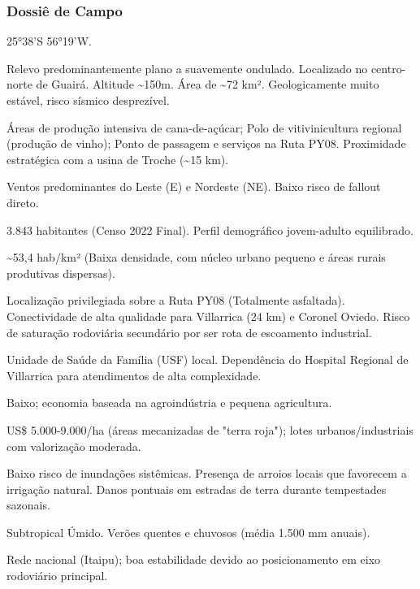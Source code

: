 \subsubsection{Dossiê de Campo}
\begin{description}[style=nextline,leftmargin=0.5cm,font=\bfseries]
\item[Coordenadas]  25°38'S 56°19'W.
\item[Topografia]  Relevo predominantemente plano a suavemente ondulado. Localizado no centro-norte de Guairá. Altitude \textasciitilde 150m. Área de \textasciitilde 72 km². Geologicamente muito estável, risco sísmico desprezível.
\item[Alvos Estratégicos]  Áreas de produção intensiva de cana-de-açúcar; Polo de vitivinicultura regional (produção de vinho); Ponto de passagem e serviços na Ruta PY08. Proximidade estratégica com a usina de Troche (\textasciitilde 15 km).
\item[Fallout]  Ventos predominantes do Leste (E) e Nordeste (NE). Baixo risco de fallout direto.
\item[População]  3.843 habitantes (Censo 2022 Final). Perfil demográfico jovem-adulto equilibrado.
\item[Densidade]  \textasciitilde 53,4 hab/\allowbreak km² (Baixa densidade, com núcleo urbano pequeno e áreas rurais produtivas dispersas).
\item[Vias de Acesso]  Localização privilegiada sobre a Ruta PY08 (Totalmente asfaltada). Conectividade de alta qualidade para Villarrica (24 km) e Coronel Oviedo. Risco de saturação rodoviária secundário por ser rota de escoamento industrial.
\item[Serviços]  Unidade de Saúde da Família (USF) local. Dependência do Hospital Regional de Villarrica para atendimentos de alta complexidade.
\item[Custo de Vida]  Baixo; economia baseada na agroindústria e pequena agricultura.
\item[Preço da Terra]  US\$ 5.000-9.000/\allowbreak ha (áreas mecanizadas de "terra roja"); lotes urbanos/\allowbreak industriais com valorização moderada.
\item[Hidrologia]  Baixo risco de inundações sistêmicas. Presença de arroios locais que favorecem a irrigação natural. Danos pontuais em estradas de terra durante tempestades sazonais.
\item[Clima]  Subtropical Úmido. Verões quentes e chuvosos (média 1.500 mm anuais).
\item[Energia]  Rede nacional (Itaipu); boa estabilidade devido ao posicionamento em eixo rodoviário principal.

\end{description}
